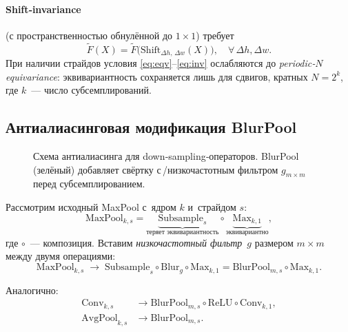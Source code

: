 \paragraph{Shift‑invariance} (с пространственностью обнулённой до $1\times1$) требует
\begin{equation}
\tilde F(X) = \tilde F\bigl(\mathrm{Shift}_{\Delta h,\,\Delta w}(X)\bigr), \quad \forall\, \Delta h, \Delta w.\label{eq:inv}
\end{equation}
При наличии страйдов условия \eqref{eq:eqv}–\eqref{eq:inv} ослабляются до \emph{periodic‑$N$ equivariance}: эквивариантность сохраняется лишь для сдвигов, кратных $N=2^k$, где $k$ — число субсемплирований.

\subsection{Антиалиасинговая модификация BlurPool}
\begin{figure}[t]
  \centering
  \caption{Схема антиалиасинга для down‑sampling‑операторов. BlurPool (зелёный) добавляет свёртку с\,/низкочастотным фильтром $g_{m\times m}$ перед субсемплированием.}
  \label{fig:blurpool_scheme}
\end{figure}

Рассмотрим исходный MaxPool с ядром $k$ и страйдом $s$:
\begin{equation}
\mathrm{MaxPool}_{k,s} = \underbrace{\mathrm{Subsample}_{s}}_{\text{теряет эквивариантность}} \circ \underbrace{\mathrm{Max}_{k,1}}_{\text{эквивариантно}},
\end{equation}
где $\circ$ — композиция. Вставим \emph{низкочастотный фильтр}~$g$ размером $m\times m$ между двумя операциями:
\begin{equation}
\mathrm{MaxPool}_{k,s} \;\longrightarrow\; \mathrm{Subsample}_{s} \circ \mathrm{Blur}_{g} \circ \mathrm{Max}_{k,1} = \mathrm{BlurPool}_{m,s} \circ \mathrm{Max}_{k,1}.\label{eq:maxblur}
\end{equation}

Аналогично:
\begin{align}
\mathrm{Conv}_{k,s} &\to \mathrm{BlurPool}_{m,s} \circ \mathrm{ReLU} \circ \mathrm{Conv}_{k,1},\label{eq:convblur}\\[4pt]
\mathrm{AvgPool}_{k,s} &\to \mathrm{BlurPool}_{m,s}.\label{eq:avgblur}
\end{align}

